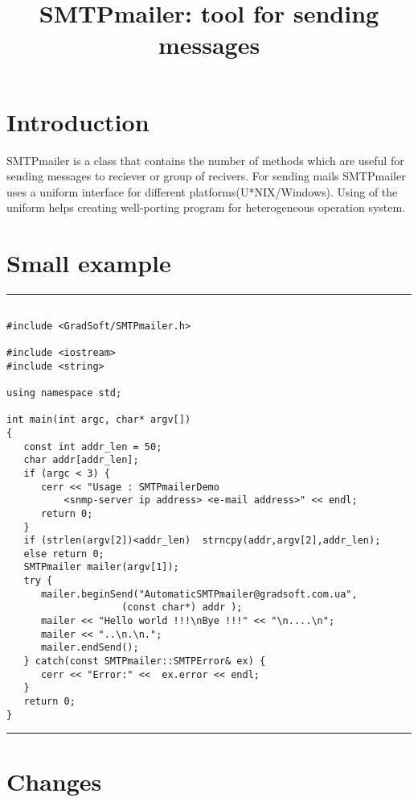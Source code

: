 \documentclass[10pt]{article}
\title{ SMTPmailer: tool for sending messages }
\begin{document}
\maketitle{}

\tableofcontents

\section{Introduction}
SMTPmailer is a class that contains the number of methods which  are useful for
sending messages to reciever or group of recivers. For sending mails SMTPmailer
uses a uniform interface for different platforms(U*NIX/Windows). Using of 
the uniform helps creating well-porting program for heterogeneous operation
system.

\section{Small example}

\hrule \vspace {10pt}

\begin{verbatim}

#include <GradSoft/SMTPmailer.h>

#include <iostream>
#include <string>

using namespace std;

int main(int argc, char* argv[])
{
   const int addr_len = 50;
   char addr[addr_len];
   if (argc < 3) {
      cerr << "Usage : SMTPmailerDemo 
	      <snmp-server ip address> <e-mail address>" << endl;
      return 0;
   }
   if (strlen(argv[2])<addr_len)  strncpy(addr,argv[2],addr_len);
   else return 0;
   SMTPmailer mailer(argv[1]);
   try {
      mailer.beginSend("AutomaticSMTPmailer@gradsoft.com.ua",
					(const char*) addr );
      mailer << "Hello world !!!\nBye !!!" << "\n....\n";
      mailer << "..\n.\n.";
      mailer.endSend();
   } catch(const SMTPmailer::SMTPError& ex) {
      cerr << "Error:" <<  ex.error << endl;
   }
   return 0;
}

\end{verbatim}

\hrule \vspace {10pt}
\section{Changes}
\end{document}
